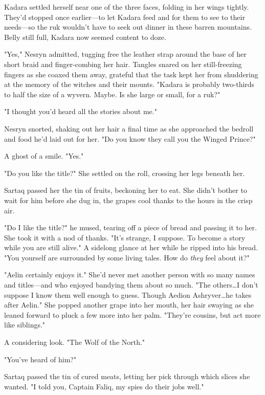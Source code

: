 Kadara settled herself near one of the three faces, folding in her wings tightly.
They'd stopped once earlier---to let Kadara feed and for them to see to their needs---so the ruk wouldn't have to seek out dinner in these barren mountains.
Belly still full, Kadara now seemed content to doze.

"Yes," Nesryn admitted, tugging free the leather strap around the base of her short braid and finger-combing her hair.
Tangles snared on her still-freezing fingers as she coaxed them away, grateful that the task kept her from shuddering at the memory of the witches and their mounts.
"Kadara is probably two-thirds to half the size of a wyvern.
Maybe.
Is she large or small, for a ruk?"

"I thought you'd heard all the stories about me."

Nesryn snorted, shaking out her hair a final time as she approached the bedroll and food he'd laid out for her.
"Do you know they call you the Winged Prince?"

A ghost of a smile.
"Yes."

"Do you like the title?"
She settled on the roll, crossing her legs beneath her.

Sartaq passed her the tin of fruits, beckoning her to eat.
She didn't bother to wait for him before she dug in, the grapes cool thanks to the hours in the crisp air.

"Do I like the title?"
he mused, tearing off a piece of bread and passing it to her.
She took it with a nod of thanks.
"It's strange, I suppose.
To become a story while you are still alive."
A sidelong glance at her while he ripped into his bread.
"You yourself are surrounded by some living tales.
How do \emph{they} feel about it?"

"Aelin certainly enjoys it."
She'd never met another person with so many names and titles---and who enjoyed bandying them about so much.
"The others\ldots I don't suppose I know them well enough to guess.
Though Aedion Ashryver\ldots he takes after Aelin."
She popped another grape into her mouth, her hair swaying as she leaned forward to pluck a few more into her palm.
"They're cousins, but act more like siblings."

A considering look.
"The Wolf of the North."

"You've heard of him?"

Sartaq passed the tin of cured meats, letting her pick through which slices she wanted.
"I told you, Captain Faliq, my spies do their jobs well."

